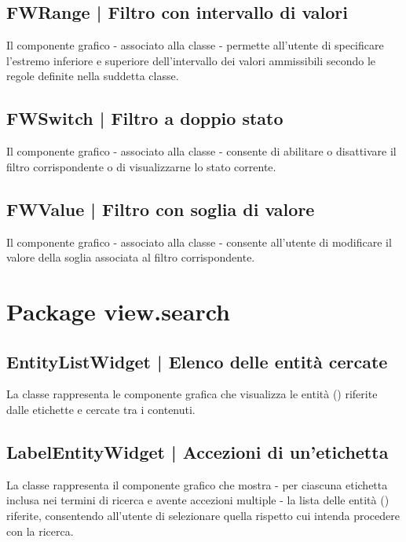\documentclass[10pt,a4paper,headinclude,footinclude,hidelinks]{scrreprt} %
\begin{document}
	\subsection[FWRange]{FWRange | Filtro con intervallo di valori}
	\label{sec:stage:design:sistema:view.filter:range-filter}
	Il componente grafico - associato alla classe \textit{} - permette all'utente di specificare l'estremo inferiore e superiore dell'intervallo dei valori ammissibili secondo le regole definite nella suddetta classe.

	\subsection[FWSwitch]{FWSwitch | Filtro a doppio stato}
	\label{sec:stage:design:sistema:view.filter:switch-filter}
	Il componente grafico - associato alla classe \textit{} - consente di abilitare o disattivare il filtro corrispondente o di visualizzarne lo stato corrente.

	\subsection[FWValue]{FWValue | Filtro con soglia di valore}
	\label{sec:stage:design:sistema:view.filter:value-filter}
	Il componente grafico - associato alla classe \textit{} - consente all'utente di modificare il valore della soglia associata al filtro corrispondente.

	\section{Package view.search}
	\label{sec:stage:design:sistema:view.search}

	\subsection[EntityListWidget]{EntityListWidget | Elenco delle entità cercate}
	\label{sec:stage:design:sistema:view.search:search-entity-list}
	La classe \textit{} rappresenta le componente grafica che visualizza le entità (\textit{}) riferite dalle etichette e cercate tra i contenuti.

	\subsection[LabelEntityWidget]{LabelEntityWidget | Accezioni di un'etichetta}
	\label{sec:stage:design:sistema:view.search:label-entity-list}
	La classe \textit{} rappresenta il componente grafico che mostra - per ciascuna etichetta inclusa nei termini di ricerca e avente accezioni multiple - la lista delle entità (\textit{}) riferite, consentendo all'utente di selezionare quella rispetto cui intenda procedere con la ricerca.
\end{document}
